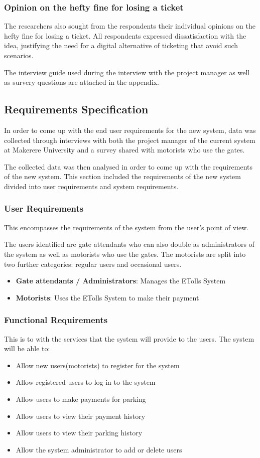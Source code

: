 \subsubsection{Opinion on the hefty fine for losing a ticket}
The researchers also sought from the respondents their individual opinions on the hefty fine for losing a ticket. All respondents expressed dissatisfaction with the idea, justifying the need for a digital alternative of ticketing that avoid such scenarios.


The interview guide used during the interview with the project manager as well as survery questions are attached in the appendix.
\clearpage

\subsection{Requirements Specification}
In order to come up with the end user requirements for the new system, data was collected through interviews with both the project manager of the current system at Makerere University and a survey shared with motorists who use the gates.

The collected data was then analysed in order to come up with the requirements of the new system. This section included the requirements of the new system divided into user requirements and system requirements.

\subsubsection{User Requirements}
This encompasses the requirements of the system from the user’s point of view.

The users identified are gate attendants who can also double as administrators of the system as well as motorists who use the gates. The motorists are split into two further categories: regular users and occasional users.
\begin{itemize}
    \item \textbf{Gate attendants / Administrators}: Manages the ETolls System
    \item \textbf{Motorists}: Uses the ETolls System to make their payment
\end{itemize}

\subsubsection{Functional Requirements}
This is to with the services that the system will provide to the users. The system will be able to:
\begin{itemize}
    \item Allow new users(motorists) to register for the system
    \item Allow registered users to log in to the system
    \item Allow users to make payments for parking
    \item Allow users to view their payment history
    \item Allow users to view their parking history
    \item Allow the system administrator to add or delete users
\end{itemize}

